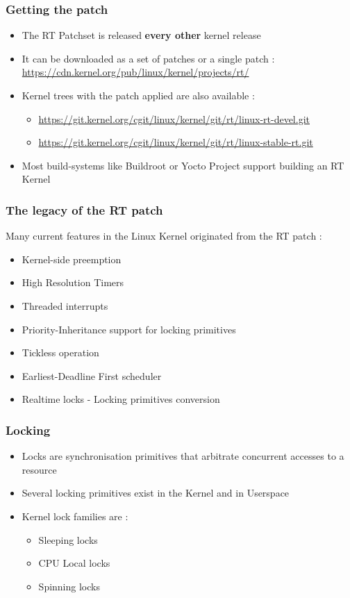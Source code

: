 \begin{frame}
  \frametitle{Getting the patch}
	\begin{itemize}
		\item The RT Patchset is released \textbf{every other} kernel release
		\item It can be downloaded as a set of patches or a single patch : \\
			\url{https://cdn.kernel.org/pub/linux/kernel/projects/rt/}
		\item Kernel trees with the patch applied are also available :
			\begin{itemize}
				\item \url{https://git.kernel.org/cgit/linux/kernel/git/rt/linux-rt-devel.git}
				\item \url{https://git.kernel.org/cgit/linux/kernel/git/rt/linux-stable-rt.git}
			\end{itemize}
		\item Most build-systems like Buildroot or Yocto Project support building an RT Kernel
	\end{itemize}
\end{frame}

\begin{frame}
  \frametitle{The legacy of the RT patch}
  Many current features in the Linux Kernel originated from the RT patch :
	\begin{itemize}
		\item Kernel-side preemption
		\item High Resolution Timers
		\item Threaded interrupts
		\item Priority-Inheritance support for locking primitives
		\item Tickless operation
		\item Earliest-Deadline First scheduler
		\item Realtime locks - Locking primitives conversion
	\end{itemize}
\end{frame}


\begin{frame}
  \frametitle{Locking}
	\begin{itemize}
		\item Locks are synchronisation primitives that arbitrate concurrent accesses to a resource
		\item Several locking primitives exist in the Kernel and in Userspace
		\item Kernel lock families are :
			\begin{itemize}
				\item Sleeping locks
				\item CPU Local locks
				\item Spinning locks
			\end{itemize}
	\end{itemize}
\end{frame}

